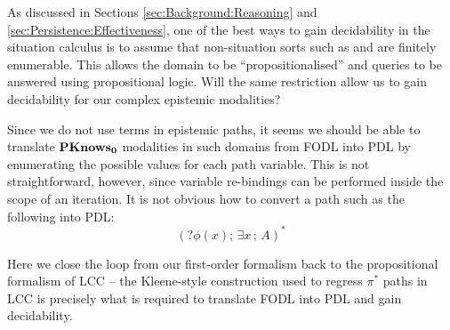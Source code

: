 As discussed in Sections \ref{sec:Background:Reasoning} and \ref{sec:Persistence:Effectiveness},
one of the best ways to gain decidability in the situation calculus
is to assume that non-situation sorts such as  and 
are finitely enumerable. This allows the domain to be {}``propositionalised''
and queries to be answered using propositional logic. Will the same
restriction allow us to gain decidability for our complex epistemic
modalities?

Since we do not use  terms in epistemic paths, it
seems we should be able to translate $\mathbf{PKnows_{0}}$ modalities in such
domains from FODL into PDL by enumerating the possible values for
each path variable. This is not straightforward, however, since variable
re-bindings can be performed inside the scope of an iteration. It
is not obvious how to convert a path such as the following into PDL:\[
(?\phi(x);\,\exists x\,;\, A)^{*}\]


Here we close the loop from our first-order formalism back to the
propositional formalism of LCC -- the Kleene-style construction used
to regress $\pi^{*}$ paths in LCC is precisely what is required to
translate FODL into PDL and gain decidability.

